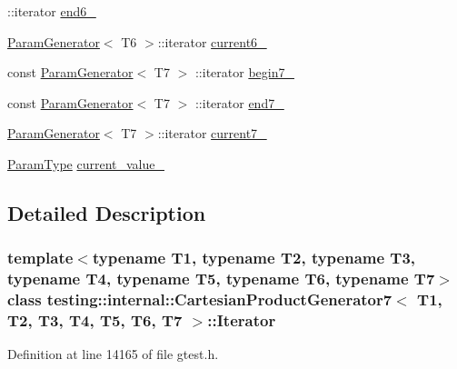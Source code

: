 \begin{DoxyCompactItemize}
\-::iterator \hyperlink{classtesting_1_1internal_1_1CartesianProductGenerator7_1_1Iterator_aa7a82d43bb33f76b3ae3a87435d3e97e}{end6\-\_\-}
\item 
\hyperlink{classtesting_1_1internal_1_1ParamGenerator}{\-Param\-Generator}$<$ \-T6 $>$\-::iterator \hyperlink{classtesting_1_1internal_1_1CartesianProductGenerator7_1_1Iterator_ab8337df5dbe6ea9aeac0a56c7ef816f9}{current6\-\_\-}
\item 
const \hyperlink{classtesting_1_1internal_1_1ParamGenerator}{\-Param\-Generator}$<$ \-T7 $>$\*
\-::iterator \hyperlink{classtesting_1_1internal_1_1CartesianProductGenerator7_1_1Iterator_a7b6566d85fbeda1c87fa7c5fe6d92214}{begin7\-\_\-}
\item 
const \hyperlink{classtesting_1_1internal_1_1ParamGenerator}{\-Param\-Generator}$<$ \-T7 $>$\*
\-::iterator \hyperlink{classtesting_1_1internal_1_1CartesianProductGenerator7_1_1Iterator_a858e56e6a8f3e6b6422ef51121b31dd5}{end7\-\_\-}
\item 
\hyperlink{classtesting_1_1internal_1_1ParamGenerator}{\-Param\-Generator}$<$ \-T7 $>$\-::iterator \hyperlink{classtesting_1_1internal_1_1CartesianProductGenerator7_1_1Iterator_a0504e607233e7862dc08914848bfbd98}{current7\-\_\-}
\item 
\hyperlink{classtesting_1_1internal_1_1CartesianProductGenerator7_a18469e04d44a379d754ff5044f09531f}{\-Param\-Type} \hyperlink{classtesting_1_1internal_1_1CartesianProductGenerator7_1_1Iterator_a1b76a85d1482a16a96efc293e8384512}{current\-\_\-value\-\_\-}
\end{DoxyCompactItemize}


\subsection{\-Detailed \-Description}
\subsubsection*{template$<$typename T1, typename T2, typename T3, typename T4, typename T5, typename T6, typename T7$>$class testing\-::internal\-::\-Cartesian\-Product\-Generator7$<$ T1, T2, T3, T4, T5, T6, T7 $>$\-::\-Iterator}



\-Definition at line 14165 of file gtest.\-h.



